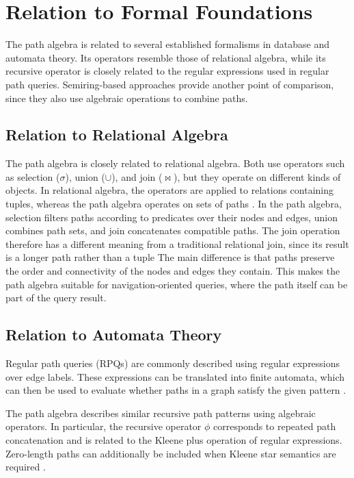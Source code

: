 \section{Relation to Formal Foundations}

The path algebra is related to several established formalisms in database and automata theory. Its operators resemble those of relational algebra, while its recursive operator is closely related to the regular expressions used in regular path queries. Semiring-based approaches provide another point of comparison, since they also use algebraic operations to combine paths.

\subsection{Relation to Relational Algebra}

The path algebra is closely related to relational algebra. Both use operators such as selection ($\sigma$), union ($\cup$), and join ($\bowtie$), but they operate on different kinds of objects. In relational algebra, the operators are applied to relations containing tuples, whereas the path algebra operates on sets of paths \cite{codd1970,angles2024path}.
In the path algebra, selection filters paths according to predicates over their nodes and edges, union combines path sets, and join concatenates compatible paths. The join operation therefore has a different meaning from a traditional relational join, since its result is a longer path rather than a tuple
The main difference is that paths preserve the order and connectivity of the nodes and edges they contain. This makes the path algebra suitable for navigation-oriented queries, where the path itself can be part of the query result.

\subsection{Relation to Automata Theory}

Regular path queries (RPQs) are commonly described using regular expressions over edge labels. These expressions can be translated into finite automata, which can then be used to evaluate whether paths in a graph satisfy the given pattern \cite{mendelzon1995}.

The path algebra describes similar recursive path patterns using algebraic operators. In particular, the recursive operator $\phi$ corresponds to repeated path concatenation and is related to the Kleene plus operation of regular expressions. Zero-length paths can additionally be included when Kleene star semantics are required \cite{angles2024path}.

